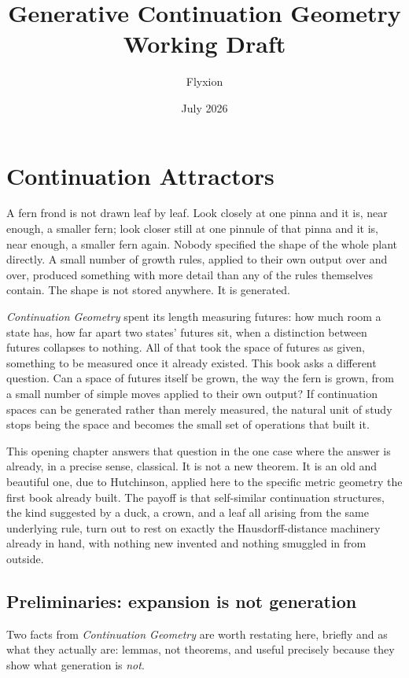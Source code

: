 \documentclass[11pt]{report}
\title{\textbf{Generative Continuation Geometry}\\[0.3em]
\large Working Draft}
\author{Flyxion}
\date{July 2026}
\begin{document}
\maketitle

\tableofcontents

\chapter{Continuation Attractors}

A fern frond is not drawn leaf by leaf. Look closely at one pinna and
it is, near enough, a smaller fern; look closer still at one pinnule
of that pinna and it is, near enough, a smaller fern again. Nobody
specified the shape of the whole plant directly. A small number of
growth rules, applied to their own output over and over, produced
something with more detail than any of the rules themselves contain.
The shape is not stored anywhere. It is generated.

\emph{Continuation Geometry} spent its length measuring futures:
how much room a state has, how far apart two states' futures sit, when
a distinction between futures collapses to nothing. All of that took
the space of futures as given, something to be measured once it
already existed. This book asks a different question. Can a space of
futures itself be grown, the way the fern is grown, from a small
number of simple moves applied to their own output? If continuation
spaces can be generated rather than merely measured, the natural unit
of study stops being the space and becomes the small set of
operations that built it.

This opening chapter answers that question in the one case where the
answer is already, in a precise sense, classical. It is not a new
theorem. It is an old and beautiful one, due to Hutchinson, applied
here to the specific metric geometry the first book already built. The
payoff is that self-similar continuation structures, the kind
suggested by a duck, a crown, and a leaf all arising from the same
underlying rule, turn out to rest on exactly the Hausdorff-distance
machinery already in hand, with nothing new invented and nothing
smuggled in from outside.

\section*{Preliminaries: expansion is not generation}

Two facts from \emph{Continuation Geometry} are worth restating here,
briefly and as what they actually are: lemmas, not theorems, and
useful precisely because they show what generation is \emph{not}.
\end{document}
